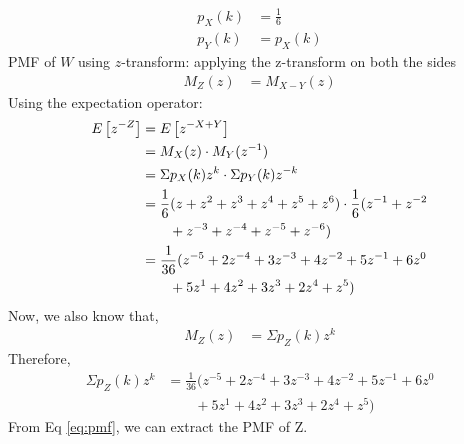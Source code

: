 \documentclass[]{article}
\begin{document}
\begin{align}
    p_X(k) &= \frac{1}{6}\\
	p_Y(k) &= p_X(k) 
\end{align}
PMF of $W$ using $z$-transform:
applying the z-transform on both the sides
\begin{align}
	M_Z(z) &= M_{X-Y}(z)
\end{align}
Using the expectation operator:
\begin{align}
	E{}\left[z^{-Z}\right] &= E{}\left[z^{-X+Y}\right]\\
	&= M_X(z)\cdot M_Y(z^{-1})\\
  &= \Sigma p_X(k)z^k \cdot \Sigma p_Y(k)z^{-k}\\
  &= \frac{1}{6}(z+z^2+z^3+z^4+z^5+z^6) \cdot \frac{1}{6}(z^{-1}+z^{-2}\nonumber\\&\qquad+z^{-3}+z^{-4}+z^{-5}+z^{-6})\\
  &= \frac{1}{36}(z^{-5}+2z^{-4}+3z^{-3}+4z^{-2}+5z^{-1}+6z^{0}\nonumber\\&\qquad+5z^{1}+4z^{2}+3z^{3}+2z^{4}+z^{5})
\end{align}
Now, we also know that, 
\begin{align}
	M_Z(z) &= \Sigma p_Z(k)z^k
\end{align}
Therefore, 
\begin{align}
	\Sigma p_Z(k)z^k &= \frac{1}{36}(z^{-5}+2z^{-4}+3z^{-3}+4z^{-2}+5z^{-1}+6z^{0}\nonumber\\&\qquad+5z^{1}+4z^{2}+3z^{3}+2z^{4}+z^{5}) \label{eq:pmf}
\end{align}
From Eq \eqref{eq:pmf}, we can extract the PMF of Z.
\end{document}
